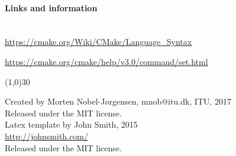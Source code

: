 \documentclass[11pt,a4paper,landscape]{scrartcl} %
\newcommand{\sectiontitle}[1]{\paragraph{#1} \ \\} %
\begin{document}
\begin{multicols}{2}
\vspace{\baselineskip} %


\sectiontitle{Links and information}

\url{https://cmake.org/Wiki/CMake/Language_Syntax}

\url{https://cmake.org/cmake/help/v3.0/command/set.html}


\vspace{\baselineskip}
\linethickness{0.5mm} %
{\color{mygray}\line(1,0){30}} %

\footnotesize{
Created by Morten Nobel-Jørgensen, mnob@itu.dk, ITU, 2017\\ 

Released under the MIT license. \\

Latex template by John Smith, 2015\\ 
\url{http://johnsmith.com/}\\
				
Released under the MIT license.
}

\end{multicols}

\end{document}
